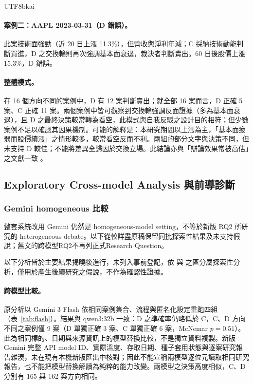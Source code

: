 \documentclass[12pt,a4paper]{article}
\newcommand{\grp}[1]{\textsf{#1}}
\begin{document}
\begin{CJK}{UTF8}{bkai}
\paragraph{案例二：AAPL 2023-03-31（\grp{D} 錯誤）。} 此案技術面強勁（近 20 日上漲 11.3\%），但營收與淨利年減；\grp{C} 採納技術動能判斷買進，\grp{D} 之交換輪則再次強調基本面衰退，裁決者判斷賣出。60 日後股價上漲 15.3\%，\grp{D} 錯誤。

\paragraph{整體模式。} 在 16 個方向不同的案例中，\grp{D} 有 12 案判斷賣出；就全部 16 案而言，D 正確 5 案、C 正確 11 案。兩個案例中皆可觀察到交換輪強調反面證據（多為基本面衰退），且 \grp{D} 之最終決策較常轉為看空，此模式與自我反駁之設計目的相符；但少數案例不足以確認其因果機制。可能的解釋是：本研究期間以上漲為主，「基本面疲弱而股價續漲」之情形較多，較常看空反而不利。兩組的部分文字與決策不同，但未支持 D 較佳；不能將差異全歸因於交換立場。此結論亦與「辯論效果常被高估」之文獻一致 \citep{smit2023mad,zhang2025stop}。
\subsection{Exploratory Cross-model Analysis 與前導診斷}

\subsubsection{Gemini homogeneous 比較}

整套系統改用 Gemini 仍然是 homogeneous-model setting，不等於新版 RQ2 所研究的 heterogeneous debate。以下從較詳盡原稿保留同批探索性結果及未支持假說；舊文的跨模型RQ2不再列正式Research Question。


以下分析皆於主要結果揭曉後進行，未列入事前登記，依 \citet{wagenmakers2012agenda} 與 \citet{nosek2018prereg} 之區分屬探索性分析，僅用於產生後續研究之假說，不作為確認性證據。

\paragraph{跨模型比較。} 原分析以 Gemini 3 Flash 依相同案例集合、流程與匿名化設定重跑四組（表~\ref{tab:flash}）。結果與 qwen3:32b 一致：\grp{D} 之準確率仍略低於 \grp{C}，\grp{C}、\grp{D} 方向不同之案例僅 9 案（\grp{D} 單獨正確 3 案、\grp{C} 單獨正確 6 案，McNemar $p=0.51$）。此為相同標的、日期與來源資訊上的模型替換比較，不是獨立資料複製。新版 Gemini 完整 API model ID、實際溫度、存取日期、種子套用狀態與逐案研究報告雜湊，未在現有本機新版匯出中核對；因此不能宣稱兩模型逐位元讀取相同研究報告，也不能把模型替換解讀為純粹的能力改變。兩模型之決策高度相似，\grp{C}、\grp{D} 分別有 165 與 162 案方向相同。


\end{CJK}
\end{document}
